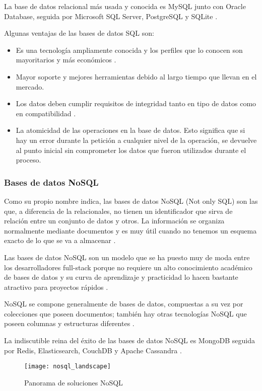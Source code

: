 La base de datos relacional más usada y conocida es MySQL junto con Oracle Database, seguida por Microsoft SQL Server, PostgreSQL y SQLite \cite{bd3}.

Algunas ventajas de las bases de datos SQL son:

\begin{itemize}
  \item Es una tecnología ampliamente conocida y los perfiles que lo conocen son mayoritarios y más económicos \cite{bd4}.
  \item Mayor soporte y mejores herramientas debido al largo tiempo que llevan en el mercado.
  \item Los datos deben cumplir requisitos de integridad tanto en tipo de datos como en compatibilidad \cite{bd8}.
  \item La atomicidad de las operaciones en la base de datos. Esto significa que si hay un error durante la petición a cualquier nivel de la operación, se devuelve al punto inicial sin comprometer los datos que fueron utilizados durante el proceso.
\end{itemize}

\subsubsection{Bases de datos NoSQL}

Como su propio nombre indica, las bases de datos NoSQL (Not only SQL) son las que, a diferencia de la relacionales, no tienen un identificador que sirva de relación entre un conjunto de datos y otros. La información se organiza normalmente mediante documentos y es muy útil cuando no tenemos un esquema exacto de lo que se va a almacenar \cite{bd3}.

Las bases de datos NoSQL son un modelo que se ha puesto muy de moda entre los desarrolladores full-stack porque no requiere un alto conocimiento académico de bases de datos y su curva de aprendizaje y practicidad lo hacen bastante atractivo para proyectos rápidos \cite{bd4}.

NoSQL se compone generalmente de bases de datos, compuestas a su vez por colecciones que poseen documentos; también hay otras tecnologías NoSQL que poseen columnas y estructuras diferentes \cite{bd4}.

La indiscutible reina del éxito de las bases de datos NoSQL es MongoDB seguida por Redis, Elasticsearch, CouchDB y Apache Cassandra \cite{bd3}.

\begin{figure}[htp!]
  \centering
  \texttt{[image: nosql\_landscape]}
  \caption{Panorama de soluciones NoSQL}
  \label{fig:nosql_landscape}
\end{figure}

